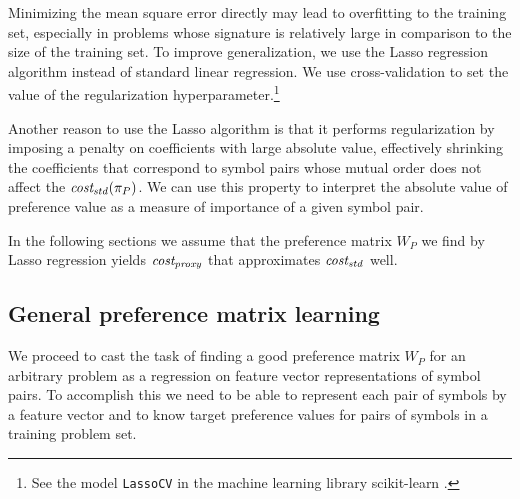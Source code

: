 Minimizing the mean square error directly may lead to overfitting to the training set,
especially in problems whose signature is relatively large in comparison to the size of the training set.
To improve generalization,
we use the Lasso regression algorithm \cite{Tibshirani1996} instead of standard linear regression.
We use cross-validation to set the value of the regularization hyperparameter.\footnote{See the model \texttt{LassoCV} in the machine learning library scikit-learn \cite{scikit-learn}.}

Another reason to use the Lasso algorithm is that it performs regularization
by imposing a penalty on coefficients with large absolute value,
effectively shrinking the coefficients that correspond to symbol pairs
whose mutual order does not affect the \(\operatorname{\mathit{cost_{std}}}(\pi_P)\).
We can use this property to interpret the absolute value of preference value
as a measure of importance of a given symbol pair.

In the following sections we assume that the preference matrix \(W_P\) we find by Lasso regression
yields \(\operatorname{\mathit{cost_{proxy}}}\) that approximates \(\operatorname{\mathit{cost_{std}}}\) well.


\subsection{General preference matrix learning}
\label{sec:general-preference}

We proceed to cast the task of finding a good preference matrix \(W_P\)
for an arbitrary problem as a regression on feature vector representations of symbol pairs.
To accomplish this we need to be able to represent each pair of symbols by a feature vector
and to know target preference values for pairs of symbols in a training problem set.

